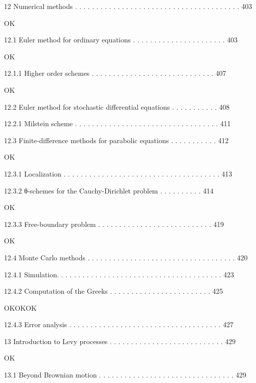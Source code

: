 12 Numerical methods . . . . . . . . . . . . . . . . . . . . . . . . . . . . . . . . . . . . . . . 403

OK

12.1 Euler method for ordinary equations . . . . . . . . . . . . . . . . . . . . . . 403

OK

12.1.1 Higher order schemes . . . . . . . . . . . . . . . . . . . . . . . . . . . . . 407

OK

12.2 Euler method for stochastic differential equations . . . . . . . . . . . 408



12.2.1 Milstein scheme . . . . . . . . . . . . . . . . . . . . . . . . . . . . . . . . . . 411



12.3 Finite-difference methods for parabolic equations . . . . . . . . . . . 412

OK

12.3.1 Localization . . . . . . . . . . . . . . . . . . . . . . . . . . . . . . . . . . . . . 413



12.3.2 θ-schemes for the Cauchy-Dirichlet problem . . . . . . . . . . 414

OK

12.3.3 Free-boundary problem . . . . . . . . . . . . . . . . . . . . . . . . . . . 419

OK

12.4 Monte Carlo methods . . . . . . . . . . . . . . . . . . . . . . . . . . . . . . . . . . . 420



12.4.1 Simulation. . . . . . . . . . . . . . . . . . . . . . . . . . . . . . . . . . . . . . . 423



12.4.2 Computation of the Greeks . . . . . . . . . . . . . . . . . . . . . . . . 425

OKOKOK

12.4.3 Error analysis . . . . . . . . . . . . . . . . . . . . . . . . . . . . . . . . . . . . 427



13 Introduction to Levy processes . . . . . . . . . . . . . . . . . . . . . . . . . . . 429

OK

13.1 Beyond Brownian motion . . . . . . . . . . . . . . . . . . . . . . . . . . . . . . . . 429



